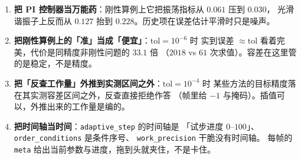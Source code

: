 \begin{enumerate}
        （DOPRI5 要 $6$ 次），但达到 $10^{-5}$ 精度需要 $38.2$ 次求值/单位时间，
        自适应 DOPRI5 只要 $18.7$。
  \item \textbf{把 PI 控制器当万能药}：刚性算例上它把振荡指标从 $0.061$ 压到 $0.030$，
        光滑谐振子上反而从 $0.127$ 抬到 $0.228$。历史项在误差估计平滑时只是噪声。
  \item \textbf{把刚性算例上的「准」当成「便宜」}：$\mathrm{tol}=10^{-6}$ 时
        实到误差 $\approx\mathrm{tol}$ 看着完美，代价是同精度非刚性问题的 $33.1$ 倍
        （$2018$ vs $61$ 次求值）。容差在这里管的是稳定，不是精度。
  \item \textbf{把「反查工作量」外推到实测区间之外}：$\mathrm{tol}=10^{-4}$ 时
        某些方法的目标精度落在其实测容差区间之外，反查直接拒绝作答
        （帧里给 $-1$ 与掩码）。插值可以，外推出来的工作量是编的。
  \item \textbf{把时间轴当时间}：\texttt{adaptive\_\allowbreak{}step} 的时间轴是
        「试步进度 $0$--$100$」、\texttt{order\_\allowbreak{}conditions} 是条件序号、
        \texttt{work\_\allowbreak{}precision} 干脆没有时间轴。
        每帧的 \texttt{meta} 给出当前参数与进度，拖到头就夹住，不是卡住。
\end{enumerate}
